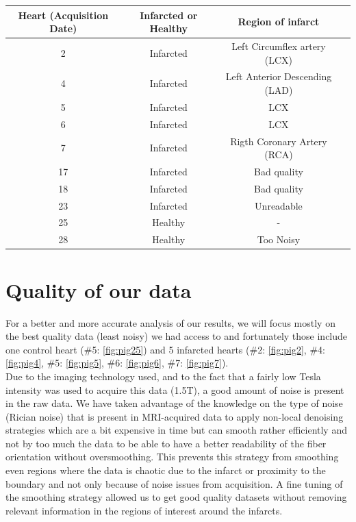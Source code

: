 \begin{center}
    \begin{tabular}{|c | c | c | c|} 
         \hline
         Heart (Acquisition Date) & Infarcted or Healthy & Region of infarct \\
         \hline
         2 & Infarcted & Left Circumflex artery (LCX) \\ 
         \hline
         4 & Infarcted & Left Anterior Descending (LAD) \\
         \hline
         5 & Infarcted & LCX \\
         \hline
         6 & Infarcted & LCX \\
         \hline
         7 & Infarcted & Rigth Coronary Artery (RCA) \\ 
         \hline
         17 & Infarcted & Bad quality \\
         \hline
         18 & Infarcted & Bad quality \\
         \hline
         23 & Infarcted & Unreadable \\
         \hline
         25 & Healthy & - \\
         \hline
         28 & Healthy & Too Noisy \\
         \hline
    \end{tabular}
\end{center}

\section{Quality of our data}

For a better and more accurate analysis of our results, we will focus mostly on the best quality data (least noisy) we had access to and fortunately those include one control heart (\#5: \ref{fig:pig25}) and 5 infarcted hearts (\#2: \ref{fig:pig2}, \#4: \ref{fig:pig4}, \#5: \ref{fig:pig5}, \#6: \ref{fig:pig6}, \#7: \ref{fig:pig7}). \\
Due to the imaging technology used, and to the fact that a fairly low Tesla intensity was used to acquire this data (1.5T), a good amount of noise is present in the raw data. We have taken advantage of the knowledge on the type of noise (Rician noise) that is present in MRI-acquired data to apply non-local denoising strategies which are a bit expensive in time but can smooth rather efficiently and not by too much the data to be able to have a better readability of the fiber orientation without oversmoothing. This prevents this strategy from smoothing even regions where the data is chaotic due to the infarct or proximity to the boundary and not only because of noise issues from acquisition. A fine tuning of the smoothing strategy allowed us to get good quality datasets without removing relevant information in the regions of interest around the infarcts.

